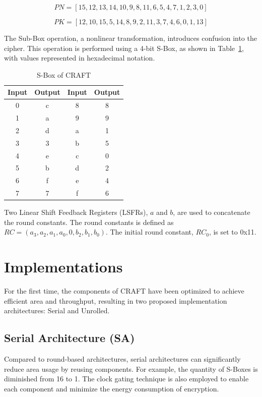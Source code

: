 \documentclass[final,5p,times,twocolumn]{elsarticle}
\begin{document}
\begin{equation}
    PN=[15,12,13,14,10,9,8,11,6,5,4,7,1,2,3,0]
    \label{permute_nibb_eq}
\end{equation}

\begin{equation}
    PK=[12,10,15,5,14,8,9,2,11,3,7,4,6,0,1,13]
    \label{key_schedule_eq}
\end{equation}

The Sub-Box operation, a nonlinear transformation, introduces confusion into the cipher. 
This operation is performed using a 4-bit S-Box, as shown in Table~\ref{tab4}, with values represented in hexadecimal notation.

\begin{table}[h]
    \centering
    \caption{S-Box of CRAFT}\label{tab4}%
    \begin{tabular}{|c|c|c|c|}
        \hline
        Input & Output & Input & Output \\
        \hline
        0     & c      & 8     & 8      \\
        1     & a      & 9     & 9      \\
        2     & d      & a     & 1      \\
        3     & 3      & b     & 5      \\
        4     & e      & c     & 0      \\
        5     & b      & d     & 2      \\
        6     & f      & e     & 4      \\
        7     & 7      & f     & 6      \\
        \hline
    \end{tabular}
\end{table}

Two Linear Shift Feedback Registers (LSFRs), $a$ and $b$, are used to concatenate the round constants.
The round constants is defined as $RC=(a_3,a_2,a_1,a_0,0,b_2,b_1,b_0)$. The initial round constant, $RC_0$, is set to 0x11.

\section{Implementations}\label{sec3}

For the first time, the components of CRAFT have been optimized to achieve efficient area and throughput, resulting in two proposed implementation architectures: Serial and Unrolled.


\subsection{Serial Architecture (SA)}\label{subsec2}
Compared to round-based architectures, serial architectures can significantly reduce area usage by reusing components.
For example, the quantity of S-Boxes is diminished from 16 to 1.
The clock gating technique is also employed to enable each component and minimize the energy consumption of encryption.
\end{document}
